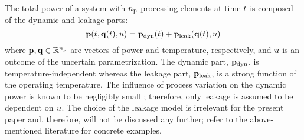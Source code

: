 The total power of a system with ${n_\text{p}}$ processing elements at time $t$ is composed of the dynamic and leakage parts:
\begin{equation} \elabel{total-power}
  \vP(\t, \vT(\t), \u) = \vP_\dyn(\t) + \vP_\leak(\vT(\t), \u)
\end{equation}
where $\mathbf{p}, \mathbf{q} \in \mathbb{R}^{n_\text{p}}$ are vectors of power and temperature, respectively, and $u$ is an outcome of the uncertain parametrization. The dynamic part, $\mathbf{p}_{\text{dyn}}$, is temperature-independent whereas the leakage part, $\mathbf{p}_{\text{leak}}$, is a strong function of the operating temperature. The influence of process variation on the dynamic power is known to be negligibly small \cite{srivastava2010, juan2011, juan2012}; therefore, only leakage is assumed to be dependent on $u$. The choice of the leakage model is irrelevant for the present paper and, therefore, will not be discussed any further; refer to the above-mentioned literature for concrete examples.
